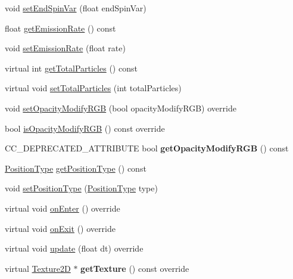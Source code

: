 \begin{DoxyCompactItemize}
void \hyperlink{classParticleSystem_a27c18cce7626182bc71b523f607587d5}{set\+End\+Spin\+Var} (float end\+Spin\+Var)
\item 
float \hyperlink{classParticleSystem_af869c4ac393b207ffaf32a3f8f9de80e}{get\+Emission\+Rate} () const
\item 
void \hyperlink{classParticleSystem_a9daefaa668017683b11e49f260f70049}{set\+Emission\+Rate} (float rate)
\item 
virtual int \hyperlink{classParticleSystem_a09eb5e6f6ed6f871c3aa786f5bc38a2c}{get\+Total\+Particles} () const
\item 
virtual void \hyperlink{classParticleSystem_a441ed0a02ecc1ed7b72ba4fb307e1bd4}{set\+Total\+Particles} (int total\+Particles)
\item 
void \hyperlink{classParticleSystem_a2c5a931c70aaa80e3fc098ec0aaf9827}{set\+Opacity\+Modify\+R\+GB} (bool opacity\+Modify\+R\+GB) override
\item 
bool \hyperlink{classParticleSystem_a36df0682b59803de36c914ce2bffe47d}{is\+Opacity\+Modify\+R\+GB} () const override
\item 
\mbox{\label{classParticleSystem_a45ee4815fe1000fefe785abdf1ce3fae}} 
C\+C\+\_\+\+D\+E\+P\+R\+E\+C\+A\+T\+E\+D\+\_\+\+A\+T\+T\+R\+I\+B\+U\+TE bool {\bfseries get\+Opacity\+Modify\+R\+GB} () const
\item 
\hyperlink{classParticleSystem_a9856f9eca1df7c6f2a2e54a1549cff27}{Position\+Type} \hyperlink{classParticleSystem_a946e4bbab07799809fd21d4d9eee8ebb}{get\+Position\+Type} () const
\item 
void \hyperlink{classParticleSystem_a4603eb21cf9e05c94d24d39cb5d21284}{set\+Position\+Type} (\hyperlink{classParticleSystem_a9856f9eca1df7c6f2a2e54a1549cff27}{Position\+Type} type)
\item 
virtual void \hyperlink{classParticleSystem_a8bd3174194f57eb26d0e1348c1067e75}{on\+Enter} () override
\item 
virtual void \hyperlink{classParticleSystem_a98582a329312cfc77d39cc872d5c344c}{on\+Exit} () override
\item 
virtual void \hyperlink{classParticleSystem_ac2b03d34a27150678a2737453ad1b7e3}{update} (float dt) override
\item 
\mbox{\label{classParticleSystem_ab3c7fa73a0d83ea706ff9122c41651e8}} 
virtual \hyperlink{classTexture2D}{Texture2D} $\ast$ {\bfseries get\+Texture} () const override
\item 

\end{DoxyCompactItemize}
